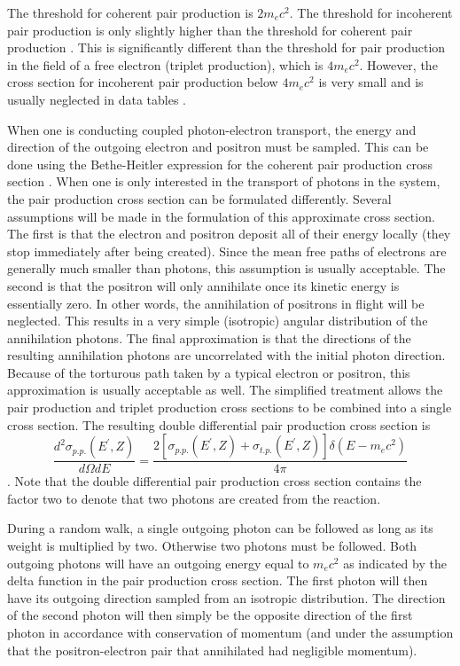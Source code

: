 The threshold for coherent pair production is $2m_ec^2$. The threshold for 
incoherent pair production is only slightly higher than the threshold for 
coherent pair production \citep{hubbell_pair_1980}. This is significantly 
different than the threshold for pair production in the field of a free 
electron (triplet production), which is $4m_ec^2$. However, the cross section 
for incoherent pair production below $4m_ec^2$ is very small and is usually 
neglected in data tables \citep{hubbell_pair_1980}. 

When one is conducting coupled photon-electron transport, the energy and 
direction of the outgoing electron and positron must be sampled. This can
be done using the Bethe-Heitler expression for the coherent pair production
cross section \citep{mukhin_experimental_1987, salvat_physics_2001}. When one 
is only interested in the transport of photons in the system, the pair 
production cross section can be formulated differently. Several assumptions 
will be made in the formulation of this approximate cross section. The first is 
that the electron and positron deposit all of their energy locally (they stop 
immediately after being created). Since the mean free paths of electrons are
generally much smaller than photons, this assumption is usually acceptable. The 
second is that the positron will only annihilate once its kinetic energy is 
essentially zero. In other words, the annihilation of positrons in flight will 
be neglected. This results in a very simple (isotropic) angular distribution of 
the annihilation photons. The final approximation is that the directions of the 
resulting annihilation photons are uncorrelated with the initial photon 
direction. Because of the torturous path taken by a typical electron or 
positron, this approximation is usually acceptable as well. The simplified 
treatment allows the pair production and triplet production cross sections to 
be combined into a single cross section. The resulting double differential pair 
production cross section is 
\begin{equation}
  \frac{d^2\sigma_{p.p.}(E^{'},Z)}{d\Omega dE} = \frac{2 [\sigma_{p.p.}(E^{'},Z) 
    + \sigma_{t.p.}(E^{'},Z)] \delta(E - m_ec^2)}{4\pi}
\end{equation}
\citep{hoogenboom_adjoint_2000,gabler_amos_2006}. Note that the double 
differential pair production cross section contains the factor two to denote 
that two photons are created from the reaction. 

During a random walk, a single outgoing photon can be followed as long as its 
weight is multiplied by two. Otherwise two photons must be followed. Both 
outgoing photons will have an outgoing energy equal to $m_ec^2$ as indicated 
by the delta function in the pair production cross section. The first photon 
will then have its outgoing direction sampled from an isotropic distribution. 
The direction of the second photon will then simply be the opposite direction 
of the first photon in accordance with conservation of momentum (and under the 
assumption that the positron-electron pair that annihilated had negligible 
momentum).

